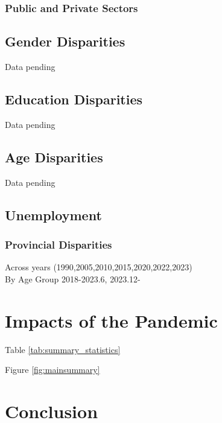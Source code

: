 \documentclass[12pt]{article}
\begin{document}
\subsubsection{Public and Private Sectors}
\subsection{Gender Disparities}
Data pending
\subsection{Education Disparities}
Data pending
\subsection{Age Disparities}
Data pending
\subsection{Unemployment}
\subsubsection{Provincial Disparities}
Across years (1990,2005,2010,2015,2020,2022,2023)\\
By Age Group 2018-2023.6, 2023.12-\\



\section{Impacts of the Pandemic \label{sec:Shocks}}





Table \ref{tab:summary_statistics} 


Figure \ref{fig:mainsummary} 
\section{Conclusion\label{sec:conclusion}}





\clearpage
\begin{singlespace}
%
%


\end{singlespace}
\end{document}
